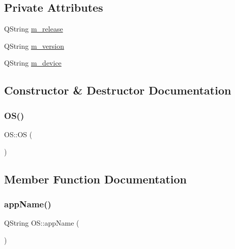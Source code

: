 \subsection*{Private Attributes}
\begin{DoxyCompactItemize}
\item 
Q\+String \mbox{\hyperlink{classOS_a61a80d72fb7d8be61c14a0363e81176a}{m\+\_\+release}}
\item 
Q\+String \mbox{\hyperlink{classOS_a483dfd8fcc3c9e240f05638f01c697fa}{m\+\_\+version}}
\item 
Q\+String \mbox{\hyperlink{classOS_aae83217d6785449722cae783468cb6ba}{m\+\_\+device}}
\end{DoxyCompactItemize}


\subsection{Constructor \& Destructor Documentation}
\mbox{\label{classOS_aee121bb510546f335b13791c7c7b4330}} 
\subsubsection{\texorpdfstring{O\+S()}{OS()}}
{\footnotesize\ttfamily O\+S\+::\+OS (\begin{DoxyParamCaption}{ }\end{DoxyParamCaption})\hspace{0.3cm}{\ttfamily [explicit]}}



\subsection{Member Function Documentation}
\mbox{\label{classOS_a414805ecb488dd84a111fb2c8c6b9401}} 
\subsubsection{\texorpdfstring{app\+Name()}{appName()}}
{\footnotesize\ttfamily Q\+String O\+S\+::app\+Name (\begin{DoxyParamCaption}{ }\end{DoxyParamCaption})}

\mbox{\label{classOS_ad55c57724a077d427b89ede6e1f8b235}} 
